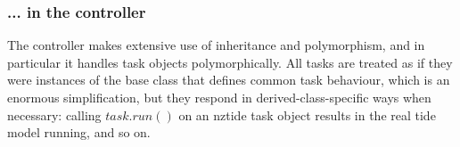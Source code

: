 \documentclass[12pt]{article}
\begin{document}
\subsubsection{... in the controller}

The controller makes extensive use of inheritance and polymorphism, and
in particular it handles task objects polymorphically. All tasks are
treated as if they were instances of the base class that defines common
task behaviour, which is an enormous simplification, but they respond in
derived-class-specific ways when necessary: calling $task.run()$ on an
nztide task object results in the real tide model running, and so on. 
\end{document}
